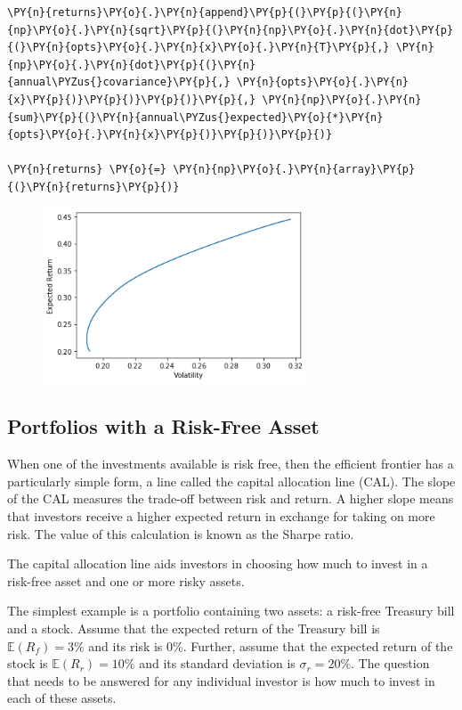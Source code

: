 \begin{tcolorbox}[breakable, size=fbox, boxrule=1pt, pad at break*=1mm,colback=cellbackground, colframe=cellborder]
\begin{Verbatim}[commandchars=\\\{\}]
    \PY{n}{returns}\PY{o}{.}\PY{n}{append}\PY{p}{(}\PY{p}{(}\PY{n}{np}\PY{o}{.}\PY{n}{sqrt}\PY{p}{(}\PY{n}{np}\PY{o}{.}\PY{n}{dot}\PY{p}{(}\PY{n}{opts}\PY{o}{.}\PY{n}{x}\PY{o}{.}\PY{n}{T}\PY{p}{,} \PY{n}{np}\PY{o}{.}\PY{n}{dot}\PY{p}{(}\PY{n}{annual\PYZus{}covariance}\PY{p}{,} \PY{n}{opts}\PY{o}{.}\PY{n}{x}\PY{p}{)}\PY{p}{)}\PY{p}{)}\PY{p}{,} \PY{n}{np}\PY{o}{.}\PY{n}{sum}\PY{p}{(}\PY{n}{annual\PYZus{}expected}\PY{o}{*}\PY{n}{opts}\PY{o}{.}\PY{n}{x}\PY{p}{)}\PY{p}{)}\PY{p}{)}

\PY{n}{returns} \PY{o}{=} \PY{n}{np}\PY{o}{.}\PY{n}{array}\PY{p}{(}\PY{n}{returns}\PY{p}{)}
\end{Verbatim}
\end{tcolorbox}

    \begin{figure}
    \centering
    \includegraphics[width=0.7\textwidth]{figures/markowitz_11_0.png}
    \end{figure}
    
\subsection{Portfolios with a Risk-Free
Asset}\label{portfolios-with-a-risk-free-asset}

When one of the investments available is risk free, then the efficient
frontier has a particularly simple form, a line called the capital
allocation line (CAL). The slope of the CAL measures the trade-off
between risk and return. A higher slope means that investors receive a
higher expected return in exchange for taking on more risk. The value of
this calculation is known as the Sharpe ratio.

The capital allocation line aids investors in choosing how much to
invest in a risk-free asset and one or more risky assets.

The simplest example is a portfolio containing two assets: a risk-free
Treasury bill and a stock. Assume that the expected return of the
Treasury bill is \(\mathbb{E}(R_f)=3\%\) and its risk is 0\%. Further, assume that
the expected return of the stock is \(\mathbb{E}(R_r)=10\%\) and its standard
deviation is \(\sigma_r=20\%\). The question that needs to be answered
for any individual investor is how much to invest in each of these
assets.


